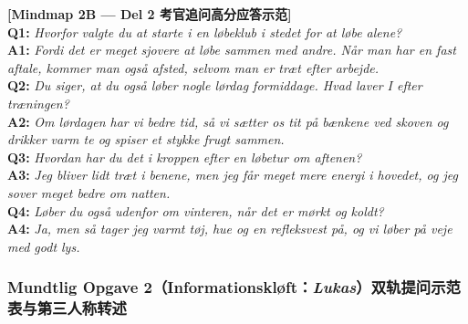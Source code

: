 \begin{transbox}
\small
\textbf{\color{NCDTeal}[Mindmap 2B --- Del 2 考官追问高分应答示范]}\\
\textbf{Q1:} \textit{Hvorfor valgte du at starte i en løbeklub i stedet for at løbe alene?}\\
\textbf{A1:} \textit{Fordi det er meget sjovere at løbe sammen med andre. Når man har en fast aftale, kommer man også afsted, selvom man er træt efter arbejde.}\\
\textbf{Q2:} \textit{Du siger, at du også løber nogle lørdag formiddage. Hvad laver I efter træningen?}\\
\textbf{A2:} \textit{Om lørdagen har vi bedre tid, så vi sætter os tit på bænkene ved skoven og drikker varm te og spiser et stykke frugt sammen.}\\
\textbf{Q3:} \textit{Hvordan har du det i kroppen efter en løbetur om aftenen?}\\
\textbf{A3:} \textit{Jeg bliver lidt træt i benene, men jeg får meget mere energi i hovedet, og jeg sover meget bedre om natten.}\\
\textbf{Q4:} \textit{Løber du også udenfor om vinteren, når det er mørkt og koldt?}\\
\textbf{A4:} \textit{Ja, men så tager jeg varmt tøj, hue og en refleksvest på, og vi løber på veje med godt lys.}
\end{transbox}

\clearpage
\subsubsection*{Mundtlig Opgave 2（Informationskløft：\textit{Lukas}）双轨提问示范表与第三人称转述}

